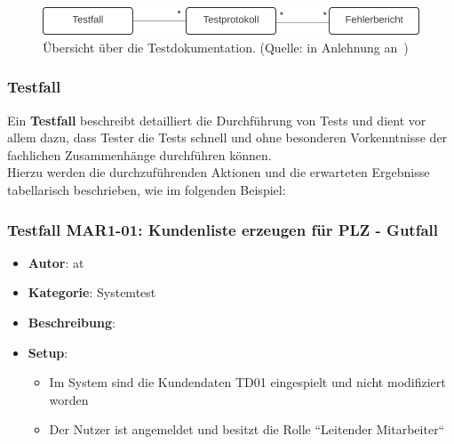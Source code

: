 \begin{figure}
    \centering
    \includegraphics[scale=0.4]{part four/Management des QS-Prozesses/img/testdokumentation}
    \caption{Übersicht über die Testdokumentation. (Quelle: in Anlehnung an~\cite[Abb. 6.1, 72]{Wed09c})}
    \label{fig:testdokumentation}
\end{figure}


\subsubsection*{Testfall}
Ein \textbf{Testfall} beschreibt detailliert die Durchführung von Tests und dient vor allem dazu, dass Tester die Tests schnell und ohne besonderen Vorkenntnisse der fachlichen Zusammenhänge durchführen können.\\
Hierzu werden die durchzuführenden Aktionen und die erwarteten Ergebnisse tabellarisch beschrieben, wie im folgenden Beispiel:

\subsubsection*{Testfall MAR1-01: Kundenliste erzeugen für PLZ - Gutfall}

    \begin{itemize}
        \item[] \textbf{Autor}: at
        \item[] \textbf{Kategorie}: Systemtest
        \item[] \textbf{Beschreibung}:
        \item[] \textbf{Setup}:
        \begin{itemize}
            \item Im System sind die Kundendaten TD01 eingespielt und nicht modifiziert worden
            \item Der Nutzer ist angemeldet und besitzt die Rolle ``Leitender Mitarbeiter``
        \end{itemize}
    \end{itemize}

